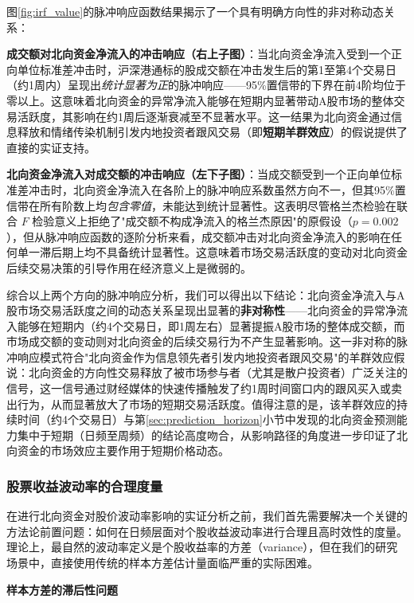 \documentclass{article}
\begin{document}
图\ref{fig:irf_value}的脉冲响应函数结果揭示了一个具有明确方向性的非对称动态关系：

\textbf{成交额对北向资金净流入的冲击响应（右上子图）}：当北向资金净流入受到一个正向单位标准差冲击时，沪深港通标的股成交额在冲击发生后的第1至第4个交易日（约1周内）呈现出\textit{统计显著为正}的脉冲响应——95\%置信带的下界在前4阶均位于零以上。这意味着北向资金的异常净流入能够在短期内显著带动A股市场的整体交易活跃度，其影响在约1周后逐渐衰减至不显著水平。这一结果为北向资金通过信息释放和情绪传染机制引发内地投资者跟风交易（即\textbf{短期羊群效应}）的假说提供了直接的实证支持。

\textbf{北向资金净流入对成交额的冲击响应（左下子图）}：当成交额受到一个正向单位标准差冲击时，北向资金净流入在各阶上的脉冲响应系数虽然方向不一，但其95\%置信带在所有阶数上均\textit{包含零值}，未能达到统计显著性。这表明尽管格兰杰检验在联合 $F$ 检验意义上拒绝了"成交额不构成净流入的格兰杰原因"的原假设（$p = 0.002$），但从脉冲响应函数的逐阶分析来看，成交额冲击对北向资金净流入的影响在任何单一滞后期上均不具备统计显著性。这意味着市场交易活跃度的变动对北向资金后续交易决策的引导作用在经济意义上是微弱的。

综合以上两个方向的脉冲响应分析，我们可以得出以下结论：北向资金净流入与A股市场交易活跃度之间的动态关系呈现出显著的\textbf{非对称性}——北向资金的异常净流入能够在短期内（约4个交易日，即1周左右）显著提振A股市场的整体成交额，而市场成交额的变动则对北向资金的后续交易行为不产生显著影响。这一非对称的脉冲响应模式符合"北向资金作为信息领先者引发内地投资者跟风交易"的羊群效应假说：北向资金的方向性交易释放了被市场参与者（尤其是散户投资者）广泛关注的信号，这一信号通过财经媒体的快速传播触发了约1周时间窗口内的跟风买入或卖出行为，从而显著放大了市场的短期交易活跃度。值得注意的是，该羊群效应的持续时间（约4个交易日）与第\ref{sec:prediction_horizon}小节中发现的北向资金预测能力集中于短期（日频至周频）的结论高度吻合，从影响路径的角度进一步印证了北向资金的市场效应主要作用于短期价格动态。

\subsubsection{股票收益波动率的合理度量}
\label{sec:vol_measure}

在进行北向资金对股价波动率影响的实证分析之前，我们首先需要解决一个关键的方法论前置问题：如何在日频层面对个股收益波动率进行合理且高时效性的度量。理论上，最自然的波动率定义是个股收益率的方差（variance），但在我们的研究场景中，直接使用传统的样本方差估计量面临严重的实际困难。

\vspace{0.5em}
\noindent\textbf{样本方差的滞后性问题}
\end{document}
